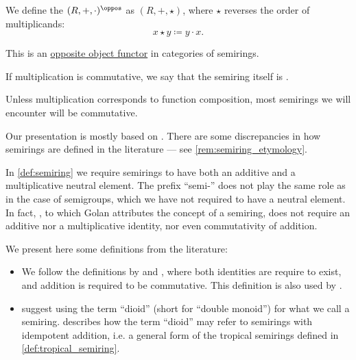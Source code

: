\begin{definition}
\begin{thmenum}
     We define the  \( (R, +, \cdot)^\oppos \) as \( (R, +, \star) \), where \( {\star} \) reverses the order of multiplicands:
    \begin{equation*}
      x \star y \coloneqq y \cdot x.
    \end{equation*}

    This is an \hyperref[con:opposite_object]{opposite object functor} in categories of semirings.

     If multiplication is commutative, we say that the semiring itself is .

    Unless multiplication corresponds to function composition, most semirings we will encounter will be commutative.
  \end{thmenum}
\end{definition}
\begin{comments}
  \item Our presentation is mostly based on \cite[1]{Golan1999Semirings}. There are some discrepancies in how semirings are defined in the literature --- see \cref{rem:semiring_etymology}.
\end{comments}

\begin{remark}\label{rem:semiring_etymology}
  In \cref{def:semiring} we require semirings to have both an additive and a multiplicative neutral element. The prefix \enquote{semi-} does not play the same role as in the case of semigroups, which we have not required to have a neutral element. In fact, \textcite{Vandiver1934Semirings}, to which Golan attributes the concept of a semiring, does not require an additive nor a multiplicative identity, nor even commutativity of addition.

  We present here some definitions from the literature:
  \begin{itemize}
    \item We follow the definitions by \textcite[1]{Golan1999Semirings} and \textcite[2]{Pin1998TropicalSemirings}, where both identities are require to exist, and addition is required to be commutative. This definition is also used by \textcite[def. 3.1]{БелоусовТкачёв2004ДискретнаяМатематика}.

    \item \Textcite*[ch. 3]{GondranMinoux1984GraphsAndAlgorithms} suggest using the term \enquote{dioid} (short for \enquote{double monoid}) for what we call a semiring. \Textcite[xi]{Golan1999Semirings} describes how the term \enquote{dioid} may refer to semirings with idempotent addition, i.e. a general form of the tropical semirings defined in \cref{def:tropical_semiring}.
  \end{itemize}
\end{remark}

